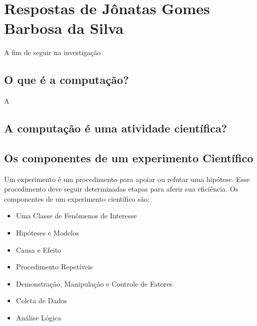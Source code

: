 \section{Respostas de Jônatas Gomes Barbosa da Silva}
A fim de seguir na investigação

\subsection{O que é a computação?}
A 
\subsection{A computação é uma atividade científica?}


\subsection{Os componentes de um experimento Científico}
Um \gls{experimento} é um procedimento para apoiar ou refutar uma hipótese. Esse procedimento deve seguir determinadas etapas para aferir sua eficiência. Os componentes de um experimento científico são:
\begin{itemize}
    \item Uma Classe de Fenômenos de Interesse
    \item Hipóteses e Modelos
    \item Causa e Efeito
    \item Procedimento Repetíveis
    \item Demonstração, Manipulação e Controle de Fatores
    \item Coleta de Dados
    \item Análise Lógica
\end{itemize}
